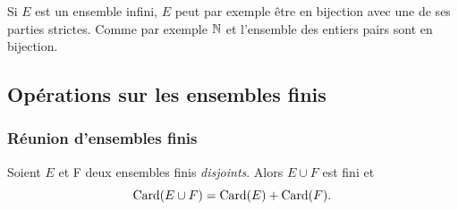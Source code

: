 Si \(E\) est un ensemble infini, \(E\) peut par exemple être en bijection 
avec une de ses parties strictes. Comme par exemple \(\mathbb{N}\) et l'ensemble des 
entiers pairs sont en bijection.

\subsection{Opérations sur les ensembles finis}

\subsubsection{Réunion d'ensembles finis}

\begin{prop}
  \label{prop:reunionfindis}
  Soient \(E\) et F deux ensembles finis \emph{disjoints}. Alors \(E\cup F\) 
  est fini et
  \begin{equation}
    \operatorname{Card}(E\cup F) = \operatorname{Card}(E) + \operatorname{Card}(F).
  \end{equation}
\end{prop}

